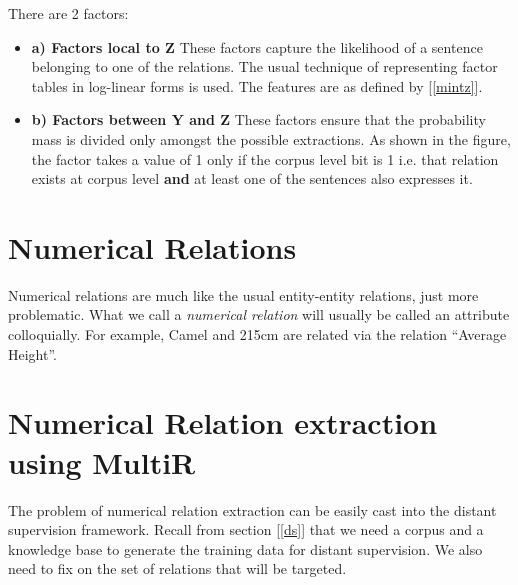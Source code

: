 \documentclass[a4paper,10pt]{article}
\begin{document}
There are 2 factors:
\begin{itemize}
\item \textbf{a) Factors local to Z} These factors capture the likelihood of a sentence belonging to one of the relations.
The usual technique of representing factor tables in log-linear forms is used. The features are as defined by 
[\ref{mintz}].

\item \textbf{b) Factors between Y and Z} These factors ensure that the probability mass is divided only amongst the possible extractions.
As shown in the figure, the factor takes a value of 1 only if the corpus level bit is 1 i.e. that relation exists at corpus level \textbf{and} 
at least one of the sentences also expresses it.
\end{itemize}
  
  
\section{Numerical Relations}
Numerical relations are much like the usual entity-entity relations, just more problematic.
What we call a \emph{numerical relation} will usually be called an attribute colloquially. 
For example, Camel and 215cm are related via the relation ``Average Height''.

\section{Numerical Relation extraction using MultiR}
The problem of numerical relation extraction can be easily cast into the distant supervision framework.
Recall from section [\ref{ds}] that we need a corpus and a knowledge base to generate the training data for distant supervision.
We also need to fix on the set of relations that will be targeted. 
\end{document}
